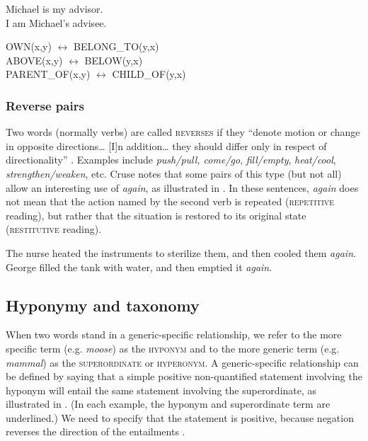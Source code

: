 \ea \label{ex:6.13}
\ea Michael is my advisor.\\
\ex I am Michael’s advisee.
                       \z
\z

\ea \label{ex:6.14}
OWN(x,y) $\leftrightarrow $ BELONG\_TO(y,x)\\
ABOVE(x,y) $\leftrightarrow $ BELOW(y,x)\\
PARENT\_OF(x,y) $\leftrightarrow $ CHILD\_OF(y,x)
\z

\subsubsection{Reverse pairs}\label{sec:6.2.2.4}

Two words (normally verbs) are called \textsc{reverses} if they “denote motion or change in opposite directions… [I]n addition… they should differ only in respect of directionality” \citep[226]{Cruse1986}. Examples include \textit{push/pull, come/go}, \textit{fill/empty}, \textit{heat/cool}, \textit{strengthen/weaken}, etc. Cruse notes that some pairs of this type (but not all) allow an interesting use of \textit{again}, as illustrated in . In these sentences, \textit{again} does not mean that the action named by the second verb is repeated (\textsc{repetitive} reading), but rather that the situation is restored to its original state (\textsc{restitutive} reading).


\ea \label{ex:6.15}
\ea The nurse heated the instruments to sterilize them, and then cooled them \textit{again}.\\
\ex George filled the tank with water, and then emptied it \textit{again}.
                       \z
\z

\subsection{Hyponymy and taxonomy}\label{sec:6.2.3}

When two words stand in a generic-specific relationship, we refer to the more specific term (e.g. \textit{moose}) as the \textsc{hyponym} and to the more generic term (e.g. \textit{mammal}) as the \textsc{superordinate} or \textsc{hyperonym}. A generic-specific relationship can be defined by saying that a simple positive non-quantified statement involving the hyponym will entail the same statement involving the superordinate, as illustrated in . (In each example, the hyponym and superordinate term are underlined.) We need to specify that the statement is positive, because negation reverses the direction of the entailments .


